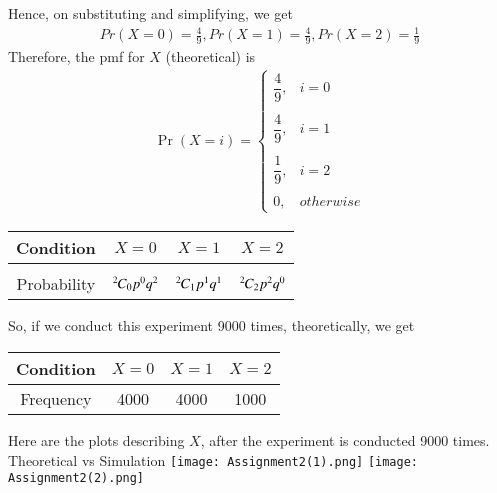 \documentclass[journal,12pt,twocolumn]{IEEEtran}
\begin{document}
Hence, on substituting and simplifying, we get
\begin{align}
    \tag{5.25.10}
    Pr(X=0)=\frac{4}{9},Pr(X=1)=\frac{4}{9},Pr(X=2)=\frac{1}{9}
\end{align}
Therefore, the pmf for $X$ (theoretical) is
\begin{align}
    \tag{5.25.11}
    \Pr(X=i) = 
	\begin{cases}
	\dfrac{4}{9}, & i=0 \\~\\[-1em]
	\dfrac{4}{9}, & i=1 \\~\\[-1em]
	\dfrac{1}{9}, & i=2 \\~\\[-1em]
	0, & otherwise
	\end{cases}
\end{align}
\begin{table}[h!]
\begin{tabular}{|c||c|c|c|}
    \hline
    Condition & $X = 0$& $X =1 $& $X=2$ \\
    \hline
    & & &\\
    Probability & ${{}^{2}\mkern-1muC_{0}}p^{0}q^{2}$ & ${{}^{2}\mkern-1muC_{1}}p^{1}q^{1}$ & ${{}^{2}\mkern-1muC_{2}}p^{2}q^{0}$\\[1ex]
    \hline
\end{tabular}
\end{table}
\newpage
So, if we conduct this experiment 9000 times, theoretically, we get 
\begin{table}[h!]
\begin{tabular}{|c||c|c|c|}
    \hline
    Condition & $X = 0$& $X =1 $& $X=2$ \\
    \hline
    Frequency & 4000 & 4000 & 1000\\
    \hline
\end{tabular}
\end{table}
\newline
Here are the plots describing $X$, after the experiment is conducted 9000 times.
\newline
\newline
Theoretical vs Simulation
\newline
\newline
\texttt{[image: Assignment2(1).png]}
\texttt{[image: Assignment2(2).png]}
\end{document}
